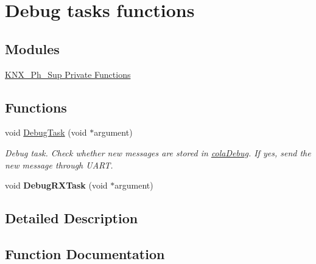 \hypertarget{group___debug___exported___functions___group2}{}\section{Debug tasks functions}
\label{group___debug___exported___functions___group2}
\subsection*{Modules}
\begin{DoxyCompactItemize}
\item 
\hyperlink{group___k_n_x___p_h___sup___private___functions}{K\+N\+X\+\_\+\+Ph\+\_\+\+Sup Private Functions}
\end{DoxyCompactItemize}
\subsection*{Functions}
\begin{DoxyCompactItemize}
\item 
void \hyperlink{group___debug___exported___functions___group2_ga0e7fca846e34e06a1f62249fe8a30a44}{Debug\+Task} (void $\ast$argument)
\begin{DoxyCompactList}\small\item\em Debug task. Check whether new messages are stored in \hyperlink{group___k_n_x___p_h___sup___private___variables_ga314fd637d927bd6a2551e119de623aa5}{cola\+Debug}. If yes, send the new message through U\+A\+RT. \end{DoxyCompactList}\item 
void {\bfseries Debug\+R\+X\+Task} (void $\ast$argument)\hypertarget{group___debug___exported___functions___group2_ga8013ff117a9e96e630d30771cf9b0199}{}\label{group___debug___exported___functions___group2_ga8013ff117a9e96e630d30771cf9b0199}

\end{DoxyCompactItemize}


\subsection{Detailed Description}


\subsection{Function Documentation}
